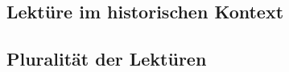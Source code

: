\subsection{Lektüre im historischen Kontext}
\begin{comment}

  [Gallop2007]
  re and complained that de
  constructionist literary criticism as practiced in United States English
  departments was in fact all too much like the old New Criticism--elitist,
  canonical, and ahistorical.

  "It is precisely my opposition to timeless universals that makes
  me value close reading. I would argue that close reading poses an ongoing
  threat to easy, reductive generalization, that it is a method for resisting
  and calling into question our inevitable tendency to bring things together
  in smug, overarching conclusions. I would argue that close reading may in
  fact be the best antidote we have to the timeless and the universal."

  --> Verständnis, das sich mit North's account on Richards' idea zusammenfügt

  [Kolodny1980] %
  ``we might better serve the cause of literature by developing standards for evaluating
    the adequacy of our critical methods.45 This does not mean that I wish to discard aesthetic valuation.''
  ``feminist literary critics
  are essentially seeking to discover how aesthetic value is assigned
  in the first place, where it resides (in the text or in the reader), and,
  most importantly, what validity may really be claimed by our aes-
  thetic "judgments." What ends do those judgments serve, the fem-
  inist asks; and what conceptions of the world or ideological stances
  do they (even if unwittingly) help to perpetuate''
\end{comment}

\subsection{Pluralität der Lektüren}

